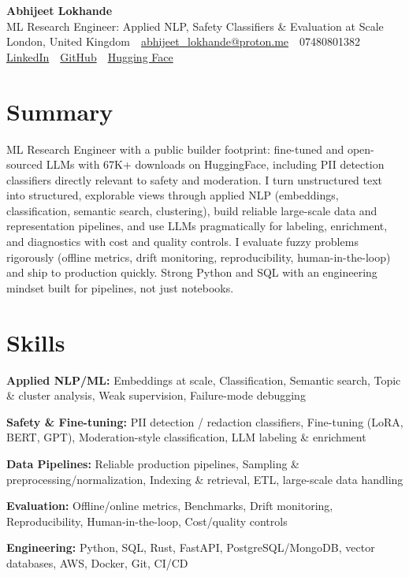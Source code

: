 \documentclass[10pt,a4paper]{article}
\newcommand{\sep}{\,\textcolor{accent!60}{\textbar}\,}
\begin{document}
\begin{center}
  {\fontsize{24}{26}\selectfont\bfseries Abhijeet Lokhande}\\[3pt]
  {\color{accent}\large ML Research Engineer: Applied NLP, Safety Classifiers \& Evaluation at Scale}\\[5pt]
  {\small
    London, United Kingdom \sep
    \href{mailto:abhijeet_lokhande@proton.me}{abhijeet\_lokhande@proton.me} \sep
    07480801382 \\[2pt]
    \href{https://www.linkedin.com/in/ablds/}{LinkedIn} \sep
    \href{https://github.com/abhijeetscode}{GitHub} \sep
    \href{https://huggingface.co/ab-ai}{Hugging Face}
  }
\end{center}
\vspace{2pt}

\section{Summary}
ML Research Engineer with a public builder footprint: fine-tuned and open-sourced LLMs with 67K+ downloads on HuggingFace, including PII detection classifiers directly relevant to safety and moderation. I turn unstructured text into structured, explorable views through applied NLP (embeddings, classification, semantic search, clustering), build reliable large-scale data and representation pipelines, and use LLMs pragmatically for labeling, enrichment, and diagnostics with cost and quality controls. I evaluate fuzzy problems rigorously (offline metrics, drift monitoring, reproducibility, human-in-the-loop) and ship to production quickly. Strong Python and SQL with an engineering mindset built for pipelines, not just notebooks.

\section{Skills}
\begin{tight}
  \item[\textcolor{accent}{\small$\bullet$}] \textbf{Applied NLP/ML:} Embeddings at scale, Classification, Semantic search, Topic \& cluster analysis, Weak supervision, Failure-mode debugging
  \item[\textcolor{accent}{\small$\bullet$}] \textbf{Safety \& Fine-tuning:} PII detection / redaction classifiers, Fine-tuning (LoRA, BERT, GPT), Moderation-style classification, LLM labeling \& enrichment
  \item[\textcolor{accent}{\small$\bullet$}] \textbf{Data Pipelines:} Reliable production pipelines, Sampling \& preprocessing/normalization, Indexing \& retrieval, ETL, large-scale data handling
  \item[\textcolor{accent}{\small$\bullet$}] \textbf{Evaluation:} Offline/online metrics, Benchmarks, Drift monitoring, Reproducibility, Human-in-the-loop, Cost/quality controls
  \item[\textcolor{accent}{\small$\bullet$}] \textbf{Engineering:} Python, SQL, Rust, FastAPI, PostgreSQL/MongoDB, vector databases, AWS, Docker, Git, CI/CD
\end{tight}
\end{document}
